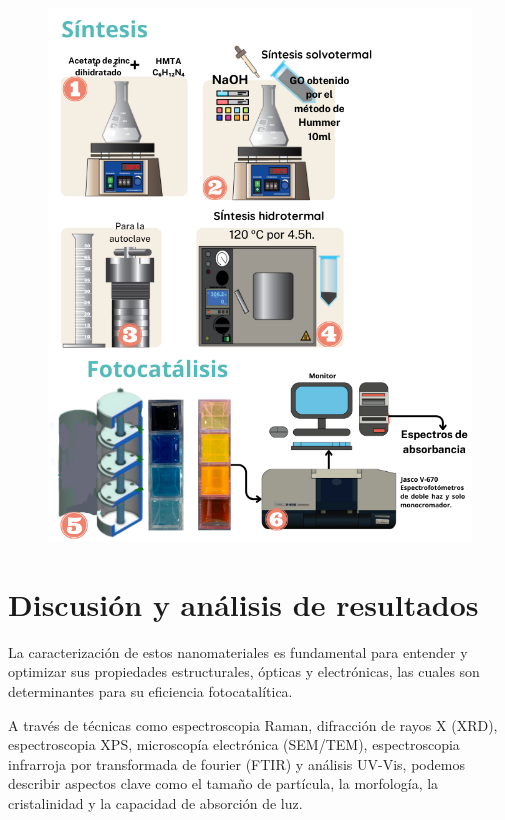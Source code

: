 \documentclass[12pt]{article}
\begin{document}
\begin{figure}[H]
        	\begin{center}
         		\includegraphics[width = 1\textwidth]{Imagenes/ZnO_GO_Sintesis.png}
        	\end{center} 
        \end{figure}

\newpage
\section{Discusión y análisis de resultados}
 La caracterización de estos nanomateriales es fundamental para entender y optimizar sus propiedades estructurales, ópticas y electrónicas, las cuales son determinantes para su eficiencia fotocatalítica.\vspace{1em} %

A través de técnicas como espectroscopia Raman, difracción de rayos X (XRD), espectroscopia XPS, microscopía electrónica (SEM/TEM), espectroscopia infrarroja por transformada de fourier (FTIR) y análisis UV-Vis, podemos describir aspectos clave como el tamaño de partícula, la morfología, la cristalinidad y la capacidad de absorción de luz.\vspace{1em} %
\end{document}
